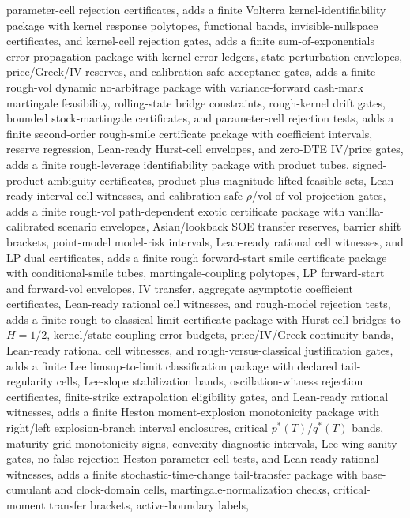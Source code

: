 \documentclass[11pt]{article}
\begin{document}
parameter-cell rejection certificates, adds a finite Volterra kernel-identifiability package with
kernel response polytopes, functional bands, invisible-nullspace certificates, and kernel-cell
rejection gates, adds a finite sum-of-exponentials error-propagation package with kernel-error
ledgers, state perturbation envelopes, price/Greek/IV reserves, and calibration-safe acceptance
gates, adds a finite rough-vol dynamic no-arbitrage package with variance-forward cash-mark
martingale feasibility, rolling-state bridge constraints, rough-kernel drift gates, bounded
stock-martingale certificates, and parameter-cell rejection tests, adds a finite second-order
rough-smile certificate package with coefficient intervals, reserve regression, Lean-ready
Hurst-cell envelopes, and zero-DTE IV/price gates, adds a finite rough-leverage identifiability
package with product tubes, signed-product ambiguity certificates, product-plus-magnitude lifted
feasible sets, Lean-ready interval-cell witnesses, and calibration-safe \(\rho\)/vol-of-vol
projection gates, adds a finite rough-vol path-dependent exotic certificate package with
vanilla-calibrated scenario envelopes, Asian/lookback SOE transfer reserves, barrier shift brackets,
point-model model-risk intervals, Lean-ready rational cell witnesses, and LP dual certificates, adds
a finite rough forward-start smile certificate package with conditional-smile tubes,
martingale-coupling polytopes, LP forward-start and forward-vol envelopes, IV transfer, aggregate
asymptotic coefficient certificates, Lean-ready rational cell witnesses, and rough-model rejection
tests, adds a finite rough-to-classical limit certificate package with Hurst-cell bridges to
\(H=1/2\), kernel/state coupling error budgets, price/IV/Greek continuity bands, Lean-ready rational
cell witnesses, and rough-versus-classical justification gates, adds a finite Lee limsup-to-limit
classification package with declared tail-regularity cells, Lee-slope stabilization bands,
oscillation-witness rejection certificates, finite-strike extrapolation eligibility gates, and
Lean-ready rational witnesses, adds a finite Heston moment-explosion monotonicity package with
right/left explosion-branch interval enclosures, critical \(p^*(T)\)/\(q^*(T)\) bands,
maturity-grid monotonicity signs, convexity diagnostic intervals, Lee-wing sanity gates,
no-false-rejection Heston parameter-cell tests, and Lean-ready rational witnesses, adds a finite
stochastic-time-change tail-transfer package with base-cumulant and clock-domain cells,
martingale-normalization checks, critical-moment transfer brackets, active-boundary labels,
\end{document}
